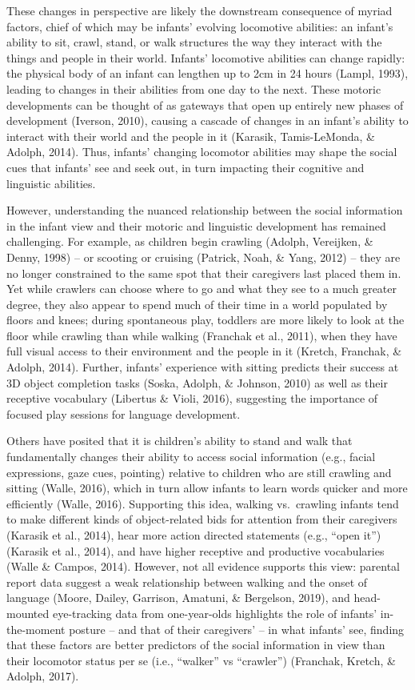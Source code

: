 \documentclass[english,man]{apa6}
\begin{document}
These changes in perspective are likely the downstream consequence of
myriad factors, chief of which may be infants' evolving locomotive
abilities: an infant's ability to sit, crawl, stand, or walk structures
the way they interact with the things and people in their world.
Infants' locomotive abilities can change rapidly: the physical body of
an infant can lengthen up to 2cm in 24 hours (Lampl, 1993), leading to
changes in their abilities from one day to the next. These motoric
developments can be thought of as gateways that open up entirely new
phases of development (Iverson, 2010), causing a cascade of changes in
an infant's ability to interact with their world and the people in it
(Karasik, Tamis-LeMonda, \& Adolph, 2014). Thus, infants' changing
locomotor abilities may shape the social cues that infants' see and seek
out, in turn impacting their cognitive and linguistic abilities.

However, understanding the nuanced relationship between the social
information in the infant view and their motoric and linguistic
development has remained challenging. For example, as children begin
crawling (Adolph, Vereijken, \& Denny, 1998) -- or scooting or cruising
(Patrick, Noah, \& Yang, 2012) -- they are no longer constrained to the
same spot that their caregivers last placed them in. Yet while crawlers
can choose where to go and what they see to a much greater degree, they
also appear to spend much of their time in a world populated by floors
and knees; during spontaneous play, toddlers are more likely to look at
the floor while crawling than while walking (Franchak et al., 2011),
when they have full visual access to their environment and the people in
it (Kretch, Franchak, \& Adolph, 2014). Further, infants' experience
with sitting predicts their success at 3D object completion tasks
(Soska, Adolph, \& Johnson, 2010) as well as their receptive vocabulary
(Libertus \& Violi, 2016), suggesting the importance of focused play
sessions for language development.

Others have posited that it is children's ability to stand and walk that
fundamentally changes their ability to access social information (e.g.,
facial expressions, gaze cues, pointing) relative to children who are
still crawling and sitting (Walle, 2016), which in turn allow infants to
learn words quicker and more efficiently (Walle, 2016). Supporting this
idea, walking vs.~crawling infants tend to make different kinds of
object-related bids for attention from their caregivers (Karasik et al.,
2014), hear more action directed statements (e.g., \enquote{open it})
(Karasik et al., 2014), and have higher receptive and productive
vocabularies (Walle \& Campos, 2014). However, not all evidence supports
this view: parental report data suggest a weak relationship between
walking and the onset of language (Moore, Dailey, Garrison, Amatuni, \&
Bergelson, 2019), and head-mounted eye-tracking data from one-year-olds
highlights the role of infants' in-the-moment posture -- and that of
their caregivers' -- in what infants' see, finding that these factors
are better predictors of the social information in view than their
locomotor status per se (i.e., \enquote{walker} vs \enquote{crawler})
(Franchak, Kretch, \& Adolph, 2017).
\end{document}
